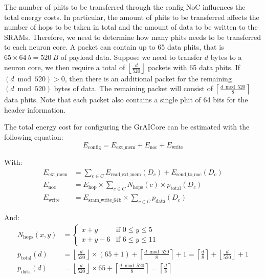 The number of phits to be transferred through the config NoC influences the total energy costs.
In particular, the amount of phits to be transferred affects the number of hops to be taken in total and the amount of data to be written to the SRAMs.
Therefore, we need to determine how many phits needs to be transferred to each neuron core.
A packet can contain up to 65 data phits, that is $65 \times \SI{64}{b} = \SI{520}{B}$ of payload data.
Suppose we need to transfer $d$ bytes to a neuron core, we then require a total of $\left\lfloor \frac{d}{520} \right\rfloor$ packets with 65 data phits.
If $\left( d \bmod 520 \right) > 0$, then there is an additional packet for the remaining $\left( d \bmod 520 \right)$ bytes of data.
The remaining packet will consist of $\left\lceil \frac{d \bmod 520}{8}\right\rceil$ data phits.
Note that each packet also contains a single phit of 64 bits for the header information.

The total energy cost for configuring the GrAICore can be estimated with the following equation:
\begin{equation}
    E_{\textrm{config}} = E_{\textrm{ext\_mem}} + E_{\textrm{noc}} + E_{\textrm{write}}
\end{equation}

With:
\begin{align*} 
E_{\textrm{ext\_mem}} &= 
        \sum_{c \in C}^{}{E_\textrm{read\_ext\_mem}(D_c) + E_{\textrm{send\_to\_noc}}(D_c)} \\
E_{\textrm{noc}} &=
    E_{\textrm{hop}} \times \sum_{c \in C}^{}{N_\textrm{hops}(c) \times p_{\textrm{total}}(D_c)} \\
E_{\textrm{write}} &=
    E_{\textrm{sram\_write\_64b}} \times \sum_{c \in C}^{}{p_{\textrm{data}}(D_c)}
\end{align*}

And:
\begin{align*} 
N_{\textrm{hops}}(x,y) &=
    \begin{cases} 
        x + y & \textrm{if } 0 \leq y \leq 5 \\
        x + y - 6 & \text{if } 6 \leq y \leq 11
    \end{cases}
\\
p_{\textrm{total}}(d) &=
    \left\lfloor \frac{d}{520} \right\rfloor \times (65 + 1) + \left\lceil \frac{d \bmod 520}{8} \right\rceil + 1 =
    \left\lceil \frac{d}{8} \right\rceil + \left\lfloor \frac{d}{520} \right\rfloor + 1 
\\
p_{\textrm{data}}(d) &=
    \left\lfloor \frac{d}{520} \right\rfloor \times 65 + \left\lceil \frac{d \bmod 520}{8} \right\rceil =
    \left\lceil \frac{d}{8} \right\rceil
\end{align*}

